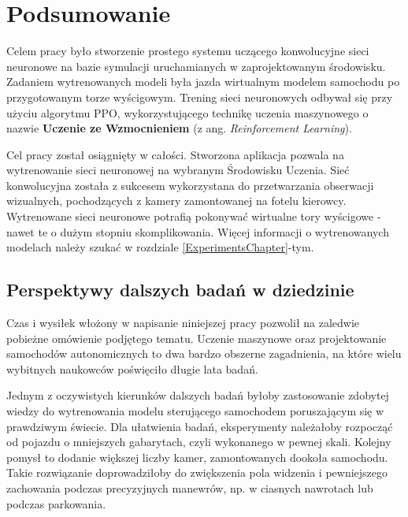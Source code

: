 \chapter*{Podsumowanie}
Celem pracy było stworzenie prostego systemu uczącego konwolucyjne sieci neuronowe na bazie symulacji uruchamianych w zaprojektowanym środowisku. Zadaniem wytrenowanych modeli była jazda wirtualnym modelem samochodu po przygotowanym torze wyścigowym. Trening sieci neuronowych odbywał się przy użyciu algorytmu PPO, wykorzystującego technikę uczenia maszynowego o nazwie \textbf{Uczenie ze Wzmocnieniem} (z ang. \textit{Reinforcement Learning}).

Cel pracy został osiągnięty w całości. Stworzona aplikacja pozwala na wytrenowanie sieci neuronowej na wybranym Środowisku Uczenia. Sieć konwolucyjna została z sukcesem wykorzystana do przetwarzania obserwacji wizualnych, pochodzących z kamery zamontowanej na fotelu kierowcy. Wytrenowane sieci neuronowe potrafią pokonywać wirtualne tory wyścigowe - nawet te o dużym stopniu skomplikowania. Więcej informacji o wytrenowanych modelach należy szukać w rozdziale \ref{ExperimentsChapter}-tym.

\section*{Perspektywy dalszych badań w dziedzinie}
Czas i wysiłek włożony w napisanie niniejszej pracy pozwolił na zaledwie pobieżne omówienie podjętego tematu. Uczenie maszynowe oraz projektowanie samochodów autonomicznych to dwa bardzo obszerne zagadnienia, na które wielu wybitnych naukowców poświęciło długie lata badań.

Jednym z oczywistych kierunków dalszych badań byłoby zastosowanie zdobytej wiedzy do wytrenowania modelu sterującego samochodem poruszającym się w prawdziwym świecie. Dla ułatwienia badań, eksperymenty należałoby rozpocząć od pojazdu o mniejszych gabarytach, czyli wykonanego w pewnej skali. Kolejny pomysł to dodanie większej liczby kamer, zamontowanych dookoła samochodu. Takie rozwiązanie doprowadziłoby do zwiększenia pola widzenia i pewniejszego zachowania podczas precyzyjnych manewrów, np. w ciasnych nawrotach lub podczas parkowania.